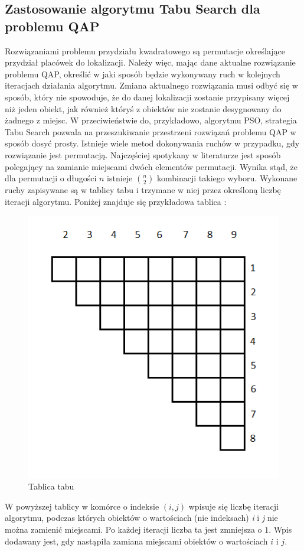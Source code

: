 \subsection{Zastosowanie algorytmu Tabu Search dla problemu QAP}
Rozwiązaniami problemu przydziału kwadratowego są permutacje określające przydział placówek do lokalizacji. Należy więc, mając dane aktualne rozwiązanie problemu QAP, określić w jaki sposób będzie wykonywany ruch w kolejnych iteracjach działania algorytmu. Zmiana aktualnego rozwiązania musi odbyć się w sposób, który nie spowoduje, że do danej lokalizacji zostanie przypisany więcej niż jeden obiekt, jak również któryś z obiektów nie zostanie desygnowany do żadnego z miejsc. W przeciwieństwie do, przykładowo, algorytmu PSO, strategia Tabu Search pozwala na przeszukiwanie przestrzeni rozwiązań problemu QAP w sposób dosyć prosty. Istnieje wiele metod dokonywania ruchów w przypadku, gdy rozwiązanie jest permutacją. Najczęściej spotykany w literaturze jest sposób polegający na zamianie miejscami dwóch elementów permutacji. Wynika stąd, że dla permutacji o długości $n$ istnieje $n\choose 2$ kombinacji takiego wyboru. Wykonane ruchy zapisywane są w tablicy tabu i trzymane w niej przez określoną liczbę iteracji algorytmu. Poniżej znajduje się przykładowa tablica \cite{MICH_JAK}:
\newpage
\begin{figure}[h]
\begin{center}
\includegraphics[scale=0.8]{tabu}
\end{center}
\caption{Tablica tabu}
\end{figure}
W powyższej tablicy w komórce o indeksie $(i,j)$ wpisuje się liczbę iteracji algorytmu, podczas których obiektów o wartościach (nie indeksach) \textit{i} i \textit{j} nie można zamienić miejscami. Po każdej iteracji liczba ta jest zmniejsza o $1$. Wpis dodawany jest, gdy nastąpiła zamiana miejscami obiektów o wartościach $i$ i $j$.

